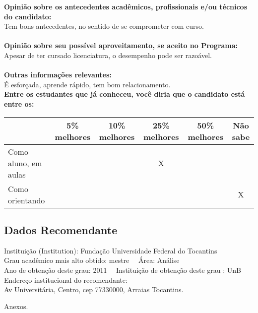 \documentclass[11pt]{article}
\begin{document}
\textbf{Opinião sobre os antecedentes acadêmicos, profissionais e/ou técnicos do candidato:}
\\Tem bons antecedentes, no sentido de se comprometer com curso.\\
\\
\textbf{Opinião sobre seu possível aproveitamento, se aceito no Programa:}
\\Apesar de ter cursado licenciatura, o desempenho pode ser razoável.\\ 
\\
\textbf{Outras informações relevantes:} \\É esforçada, aprende rápido, tem bom relacionamento.
\\[0.3cm]
\textbf{Entre os estudantes que já conheceu, você diria que o candidato está entre os:}
\\
\begin{tabular}{|l|c|c|c|c|c|}
\hline
 & 5\% melhores & 10\% melhores & 25\% melhores & 50\% melhores & Não sabe \\
\hline
Como aluno, em aulas &  &  & X &  & \\
\hline
Como orientando &  &  &  &  & X\\
\hline
\end{tabular}
\subsection*{Dados Recomendante} 
	Instituição (Institution): Fundação Universidade Federal do Tocantins
\\ 
	Grau acadêmico mais alto obtido: mestre
	\ \ Área: Análise 
	\\
	Ano de obtenção deste grau: 2011
	\ \ 
	Instituição de obtenção deste grau : UnB
	\\ 
	Endereço institucional do recomendante: \\ Av Universitária, Centro, cep 77330000, Arraias Tocantins. 
\begin{center}
Anexos.
\end{center}
\end{document}
